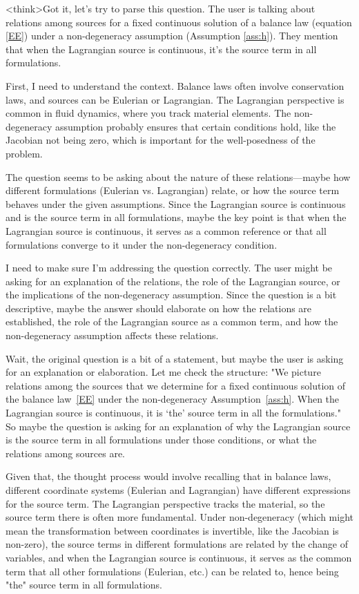 <think>Got it, let's try to parse this question. The user is talking about relations among sources for a fixed continuous solution of a balance law (equation \eqref{EE}) under a non-degeneracy assumption (Assumption \eqref{ass:h}). They mention that when the Lagrangian source is continuous, it's the source term in all formulations. 

First, I need to understand the context. Balance laws often involve conservation laws, and sources can be Eulerian or Lagrangian. The Lagrangian perspective is common in fluid dynamics, where you track material elements. The non-degeneracy assumption probably ensures that certain conditions hold, like the Jacobian not being zero, which is important for the well-posedness of the problem.

The question seems to be asking about the nature of these relations—maybe how different formulations (Eulerian vs. Lagrangian) relate, or how the source term behaves under the given assumptions. Since the Lagrangian source is continuous and is the source term in all formulations, maybe the key point is that when the Lagrangian source is continuous, it serves as a common reference or that all formulations converge to it under the non-degeneracy condition.

I need to make sure I'm addressing the question correctly. The user might be asking for an explanation of the relations, the role of the Lagrangian source, or the implications of the non-degeneracy assumption. Since the question is a bit descriptive, maybe the answer should elaborate on how the relations are established, the role of the Lagrangian source as a common term, and how the non-degeneracy assumption affects these relations.

Wait, the original question is a bit of a statement, but maybe the user is asking for an explanation or elaboration. Let me check the structure: "We picture relations among the sources that we determine for a fixed continuous solution of the balance law~\eqref{EE} under the non-degeneracy Assumption~\eqref{ass:h}. When the Lagrangian source is continuous, it is `the' source term in all the formulations." So maybe the question is asking for an explanation of why the Lagrangian source is the source term in all formulations under those conditions, or what the relations among sources are.

Given that, the thought process would involve recalling that in balance laws, different coordinate systems (Eulerian and Lagrangian) have different expressions for the source term. The Lagrangian perspective tracks the material, so the source term there is often more fundamental. Under non-degeneracy (which might mean the transformation between coordinates is invertible, like the Jacobian is non-zero), the source terms in different formulations are related by the change of variables, and when the Lagrangian source is continuous, it serves as the common term that all other formulations (Eulerian, etc.) can be related to, hence being "the" source term in all formulations.

